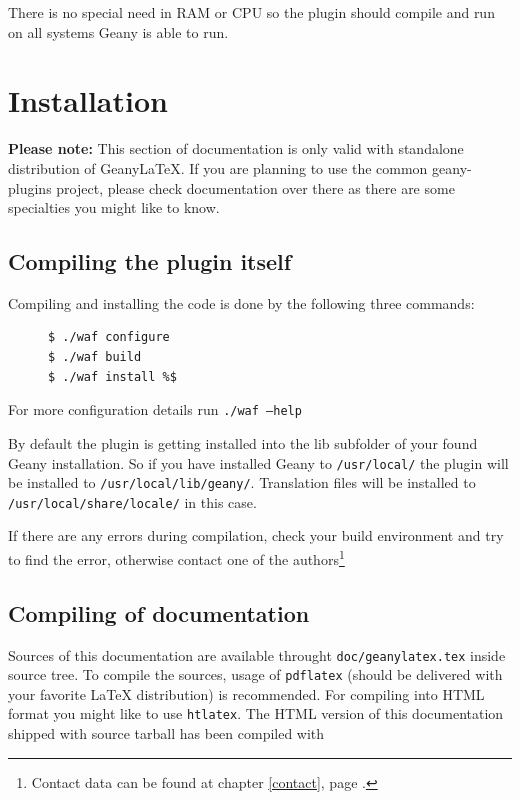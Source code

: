 \documentclass[%
a4paper,%
10pt,%
oneside,%
DIV18,
headsepline,
plainheadsepline,
footsepline,
plainfootsepline,
bibtotoc,%
liststotoc,%
BCOR12mm,%
halfparskip,%
openany,%
]{scrartcl}
\begin{document}
There is no special need in RAM or CPU so the plugin should compile and
run on all systems Geany is able to run.

\section{Installation}

\small{\textbf{Please note:} This section of documentation is only 
valid with standalone distribution of Geany\LaTeX{}. If you are 
planning to use the common geany-plugins project, please check 
documentation over there as there are some specialties you might 
like to know.}

\subsection{Compiling the plugin itself}
Compiling and installing the code is done by the following three
commands:

\begin{figure}[h!]
\begin{lstlisting}
$ ./waf configure
$ ./waf build
$ ./waf install %$
\end{lstlisting}
\end{figure}

For more configuration details run \texttt{./waf --help}

By default the plugin is getting installed into the lib subfolder of
your found Geany installation. So if you have installed Geany to
\texttt{/usr/local/} the plugin will be installed to
\texttt{/usr/local/lib/geany/}. Translation files will be installed to
\texttt{/usr/local/share/locale/} in this case.

If there are any errors during compilation, check your build environment
and try to find the error, otherwise contact one of the
authors\footnote{Contact data can be found at chapter \ref{contact},
page \pageref{contact}.}

\subsection{Compiling of documentation}
\label{sec:compiling_of_documentation}
Sources of this documentation are available throught
\texttt{doc/geanylatex.tex} inside source tree. To compile the sources,
usage of \texttt{pdflatex} (should be delivered with your favorite
\LaTeX{} distribution) is recommended. For compiling into HTML format you
might like to use \texttt{htlatex}. The HTML version of this documentation
shipped with source tarball has been compiled with
\end{document}
